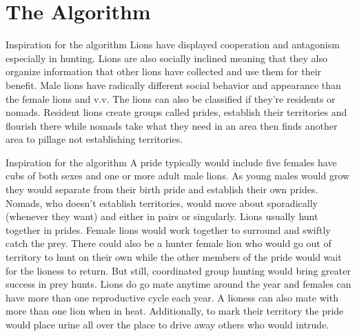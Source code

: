 \documentclass{beamer}
\begin{document}
\section{The Algorithm}

\begin{frame}{Inspiration for the algorithm}
Lions have displayed cooperation and antagonism especially in hunting. Lions are also socially inclined meaning that they also organize information that other lions have collected and use them for their benefit.
Male lions have radically different social behavior and appearance than the female lions and v.v.
The lions can also be classified if they're residents or nomads. Resident lions create groups called prides, establish their territories and flourish there while nomads take what they need in an area then finds another area to pillage not establishing territories.
\end{frame}
\begin{frame}{Inspiration for the algorithm}
A pride typically would include five females have cubs of both sexes and one or more adult male lions.
As young males would grow they would separate from their birth pride and establish their own prides.
Nomads, who doesn't establish territories, would move about sporadically (whenever they want) and either in pairs or singularly.
Lions usually hunt together in prides. Female lions would work together to surround and swiftly catch the prey. There could also be a hunter female lion who would go out of territory to hunt on their own while the other members of the pride would wait for the lioness to return. But still, coordinated group hunting would bring greater success in prey hunts.
Lions do go mate anytime around the year and females can have more than one reproductive cycle each year. A lioness can also mate with more than one lion when in heat.
Additionally, to mark their territory the pride would place urine all over the place to drive away others who would intrude.
\end{frame}

\end{document}
